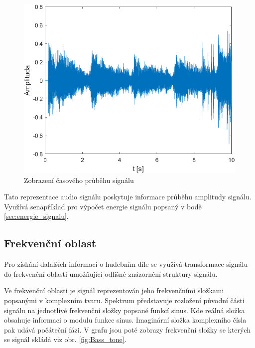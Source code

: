   \begin{figure}[H]
    \centering
    \includegraphics[width = 0.8\linewidth]{obrazky/Waveform.png}
    \caption{Zobrazení časového průběhu signálu}
    \label{fig:Waveform}
  \end{figure}

  Tato reprezentace audio signálu poskytuje informace průběhu amplitudy signálu. Využívá senapříklad pro výpočet energie signálu popsaný v bodě \ref{sec:energie_signalu}.
  
  \subsection{Frekvenční oblast} \label{sec:FFT}
  Pro získání dalalších informací o hudebním díle se využívá transformace signálu do frekvenční oblasti umožňující odlišné znázornění struktury signálu.

  Ve frekvenční oblasti je signál reprezentován jeho frekvenčními složkami popsanými v komplexním tvaru.
  Spektrum představuje rozložení původní části signálu na jednotlivé frekvenční složky popsané funkcí sinus. Kde reálná složka obsahuje informaci o modulu  funkce sinus.
  Imaginární složka komplexního čísla pak udává počáteční fázi.
  V grafu jsou poté zobrazy frekvenční složky se kterých se signál skládá viz obr. \ref*{fig:Bass_tone}.


